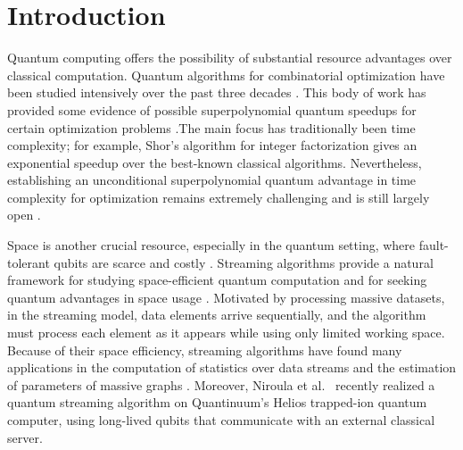 \newpage
\section{Introduction}\label{sec:introduction}
Quantum computing offers the possibility of substantial resource advantages over classical computation. Quantum algorithms for combinatorial optimization have been studied intensively over the past three decades
\cite{FarhiEtAl2001Adiabatic,
FarhiGoldstoneGutmann2014BoundedOccurrence,
Hastings2018ShortPath,
BassoEtAl2022QAOAHighDepth,
DalzellEtAl2023MindTheGap,
KapitEtAl2023RandomHypergraphXORSAT,
ShaydulinEtAl2024ScalingAdvantage}.
This body of work has provided some evidence of possible superpolynomial quantum speedups for certain optimization problems
\cite{FarhiEtAl2025HighGirthMaxCut,
LengZhengWu2023NonconvexSeparation,
ChenLiuZhandry2022Filtering,
PirnayEtAl2024InPrincipleAdvantage,
Szegedy2022QuantumAdvantageSimplified,
GilyenHastingsVazirani2021AdiabaticAdvantage,
EldarHallgren2022LatticeApproximation,jordan2025optimization}.The main focus has traditionally been time complexity; for example, Shor's algorithm for integer factorization \cite{Shor1999} gives an exponential speedup over the best-known classical algorithms.   Nevertheless, establishing an unconditional superpolynomial quantum advantage in time complexity for optimization remains extremely challenging and is still largely open \cite{BernsteinVazirani1997, Watrous2018}. 

Space is another crucial resource, especially in the
quantum setting, where fault-tolerant qubits are scarce and costly \cite{FowlerMariantoniMartinisCleland2012, BabbushMcCleanGidneyBoixoNeven2021}. Streaming algorithms provide a natural framework for studying space-efficient quantum computation and for seeking quantum advantages in space usage \cite{LeGall2006, NayakTouchette2017, Kallaugher2022}. 
Motivated by processing massive datasets\cite{BabcockBabuDatarMotwaniWidom2002, Muthukrishnan2005}, in the streaming model, data elements arrive sequentially, and the algorithm must process each element as it appears while using only limited working space. Because of their space efficiency, streaming algorithms have found many applications in the computation of statistics over data streams \cite{FlajoletMartin1985, AlonMatiasSzegedy1999} and the estimation of parameters of massive graphs \cite{BarYossefKumarSivakumar2002, McGregor2014}.
Moreover, Niroula et al.~\cite{niroula2025realization} recently realized a quantum streaming algorithm on Quantinuum’s Helios trapped-ion quantum computer, using long-lived qubits that communicate with an external classical server. 

